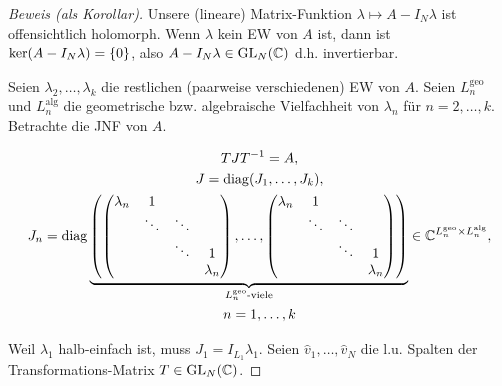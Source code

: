 \begin{proof}[Beweis (als Korollar)]

    Unsere (lineare) Matrix-Funktion $\lambda \mapsto A - I_N \lambda$ ist offensichtlich holomorph.
    Wenn $\lambda$ kein EW von $A$ ist, dann ist $\operatorname{ker}(A - I_N \lambda) = {\left \{ 0 \right \}}$, also $A - I_N \lambda \in \operatorname{GL}_N(\mathbb{C})$ d.h. invertierbar.

    Seien $\lambda_2, \dots, \lambda_k$ die restlichen (paarweise verschiedenen) EW von $A$.
    Seien $L_n^\mathrm{geo}$ und $L_n^\mathrm{alg}$ die geometrische bzw. algebraische Vielfachheit von $\lambda_n$ für $n = 2, \dots, k$.
    Betrachte die JNF von $A$.

    \begin{gather*}
        T J T^{-1} = A, \\
        J = \operatorname{diag} (J_1, \dots, J_k), \\
        J_n
        =
        \operatorname{diag}
        \underbrace
        {
            {\left ( 
                \begin{pmatrix}
                    \lambda_n & 1      &        &           \\
                              & \ddots & \ddots &           \\
                              &        & \ddots & 1         \\
                              &        &        & \lambda_n \\
                \end{pmatrix},
                \dots,
                \begin{pmatrix}
                    \lambda_n & 1      &        &           \\
                              & \ddots & \ddots &           \\
                              &        & \ddots & 1         \\
                              &        &        & \lambda_n \\
                \end{pmatrix}
             \right )}
        }_{
            L_n^\mathrm{geo} \text{-viele}
        }
        \in
        \mathbb{C}^{
            L_n^\mathrm{geo}
            \times
            L_n^\mathrm{alg}
        }, \\
        n = 1, \dots, k
    \end{gather*}

    Weil $\lambda_1$ halb-einfach ist, muss $J_1 = I_{L_1} \lambda_1$.
    Seien $\hat v_1, \dots, \hat v_N$ die l.u. Spalten der Transformations-Matrix $T \in \operatorname{GL}_N(\mathbb{C})$.


\end{proof}
